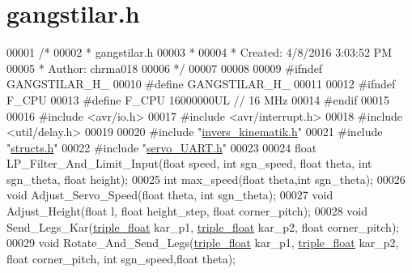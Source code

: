 \hypertarget{gangstilar_8h_source}{}\section{gangstilar.\+h}
\label{gangstilar_8h_source}

\begin{DoxyCode}
00001 \textcolor{comment}{/*}
00002 \textcolor{comment}{ * gangstilar.h}
00003 \textcolor{comment}{ *}
00004 \textcolor{comment}{ * Created: 4/8/2016 3:03:52 PM}
00005 \textcolor{comment}{ *  Author: chrma018}
00006 \textcolor{comment}{ */} 
00007 
00008 
00009 \textcolor{preprocessor}{#ifndef GANGSTILAR\_H\_}
00010 \textcolor{preprocessor}{#define GANGSTILAR\_H\_}
00011 
00012 \textcolor{preprocessor}{#ifndef F\_CPU}
00013 \textcolor{preprocessor}{#define F\_CPU 16000000UL        // 16 MHz}
00014 \textcolor{preprocessor}{#endif}
00015 
00016 \textcolor{preprocessor}{#include <avr/io.h>}
00017 \textcolor{preprocessor}{#include <avr/interrupt.h>}
00018 \textcolor{preprocessor}{#include <util/delay.h>}
00019 
00020 \textcolor{preprocessor}{#include "\hyperlink{invers__kinematik_8h}{invers\_kinematik.h}"}
00021 \textcolor{preprocessor}{#include "\hyperlink{structs_8h}{structs.h}"}
00022 \textcolor{preprocessor}{#include "\hyperlink{servo___u_a_r_t_8h}{servo\_UART.h}"}
00023 
00024 \textcolor{keywordtype}{float} LP\_Filter\_And\_Limit\_Input(\textcolor{keywordtype}{float} speed, \textcolor{keywordtype}{int} sgn\_speed, \textcolor{keywordtype}{float} theta, \textcolor{keywordtype}{int} sgn\_theta, \textcolor{keywordtype}{float} height);
00025 \textcolor{keywordtype}{int} max\_speed(\textcolor{keywordtype}{float} theta,\textcolor{keywordtype}{int} sgn\_theta);
00026 \textcolor{keywordtype}{void} Adjust\_Servo\_Speed(\textcolor{keywordtype}{float} theta, \textcolor{keywordtype}{int} sgn\_theta);
00027 \textcolor{keywordtype}{void} Adjust\_Height(\textcolor{keywordtype}{float} l, \textcolor{keywordtype}{float} height\_step, \textcolor{keywordtype}{float} corner\_pitch);
00028 \textcolor{keywordtype}{void} Send\_Legs\_Kar(\hyperlink{structtriple__float}{triple\_float} kar\_p1, \hyperlink{structtriple__float}{triple\_float} kar\_p2, \textcolor{keywordtype}{float} corner\_pitch);
00029 \textcolor{keywordtype}{void} Rotate\_And\_Send\_Legs(\hyperlink{structtriple__float}{triple\_float} kar\_p1, \hyperlink{structtriple__float}{triple\_float} kar\_p2, \textcolor{keywordtype}{float} 
      corner\_pitch, \textcolor{keywordtype}{int} sgn\_speed,\textcolor{keywordtype}{float} theta);

\end{DoxyCode}
